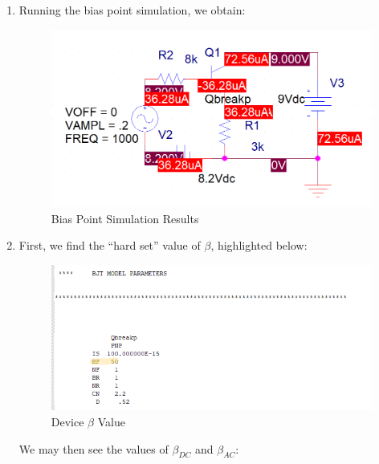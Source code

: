 \begin{enumerate}
\begin{enumerate}
\begin{enumerate}
          \item Running the bias point simulation, we obtain:

            \begin{figure}[H]
              \centering
              \includegraphics[width=.9\textwidth]{Figures/HW6-2b}
              \caption{Bias Point Simulation Results}
              \label{fig:2}
            \end{figure}

          \item First, we find the ``hard set'' value of $\beta$, highlighted below:

            \begin{figure}[H]
              \centering
              \includegraphics[width=.9\textwidth]{Figures/HW6-2c}
              \caption{Device $\beta$ Value}
              \label{fig:3}
            \end{figure}

            We may then see the values of $\beta_{DC}$ and $\beta_{AC}$:


\end{enumerate}
\end{enumerate}
\end{enumerate}
